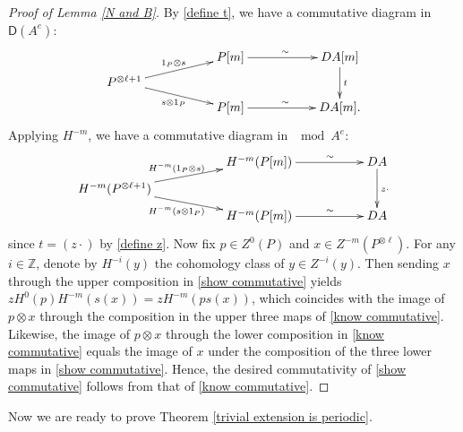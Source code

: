 \documentclass[a4paper,reqno,11pt]{amsart}
\theoremstyle{definition}
\newcommand{\DDD}{\mathsf{D}}
\newcommand{\Z}{\mathbb{Z}}
\newcommand{\old}[1]{{\red #1}}
\numberwithin{equation}{section}
\begin{document}
\begin{proof}[Proof of Lemma \ref{N and B}]
By \eqref{define t}, we have a commutative diagram in $\DDD(A^e)$:
\[\xymatrix@R0.5em{
&&P[m]\ar[rr]^\sim&&DA[m]\ar[dd]^{t}\\
P^{\otimes\ell+1}\ar[urr]^{1_P\otimes s}\ar[drr]_{s\otimes1_P}\\
&&P[m]\ar[rr]^\sim&&DA[m].
}\]
Applying $H^{-m}$, we have a commutative diagram in $\mod A^e$:
\begin{equation}\label{know commutative}
\xymatrix@R0.5em{
&&H^{-m}(P[m])\ar[rr]^(.6)\sim&&DA\ar[dd]^{z\cdot}\\
H^{-m}(P^{\otimes\ell+1})\ar[urr]^(.47){H^{-m}(1_P\otimes s)}\ar[drr]_(.47){H^{-m}(s\otimes1_P)}\\
&&H^{-m}(P[m])\ar[rr]^(.6)\sim&&DA
}\end{equation}
since $t=(z\cdot)$ by \eqref{define z}. 
Now fix $p\in Z^0(P)$ and $x\in Z^{-m}(P^{\otimes\ell})$.
For any $i\in \Z$, denote by $H^{-i}(y)$ the cohomology class of $y\in Z^{-i}(y)$.  Then sending $x$ through the upper composition in \eqref{show commutative} yields $zH^{0}(p)H^{-m}(s(x))=zH^{-m}(ps(x))$, which coincides with the image of $p\otimes x$ through the composition in the upper three maps of \eqref{know commutative}.
Likewise, the image of $p\otimes x$ through the lower composition in \eqref{know commutative} equals the image of $x$ under the composition of the three lower maps in \eqref{show commutative}.  Hence, the desired commutativity of \eqref{show commutative} follows from that of \eqref{know commutative}.
\end{proof}

Now we are ready to prove Theorem \ref{trivial extension is periodic}.
\end{document}
